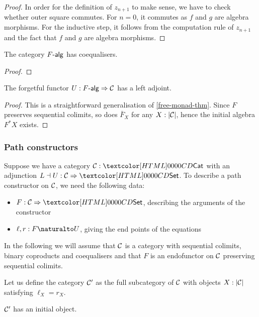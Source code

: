 \begin{proof}
  In order for the definition of $z_{n+1}$ to make sense, we have to
  check whether outer square commutes. For $n = 0$, it commutes as $f$
  and $g$ are algebra morphisms. For the inductive step, it follows
  from the computation rule of $z_{n+1}$ and the fact that $f$ and $g$
  are algebra morphisms.

  
\end{proof}

\begin{proposition}
  The category $\algcat{F}$ has coequalisers.
\end{proposition}

\begin{proof}
\end{proof}

\begin{proposition}
  The forgetful functor $U : \Func{\algcat{F}}{\Cc}$ has a left
  adjoint.
\end{proposition}

\begin{proof}
  This is a straightforward generalisation of
  \cref{free-monad-thm}. Since $F$ preserves sequential colimits, so
  does $\bar{F}_X$ for any $X : | \mathcal{C} |$, hence the initial algebra
  $F^* X$ exists.
\end{proof}

\subsubsection{Path constructors}
Suppose we have a category $\Cc : \Cat$ with an adjunction
$L \dashv U : \Func{\Cc}{\Set}$. To describe a path constructor
on $\mathcal{C}$, we need the following data:
\begin{itemize}
\item $F : \Func{\Cc}{\Set}$, describing the arguments of the constructor
\item $\ell, r : \Nat{F}{U}$, giving the end points of the equations
\end{itemize}

In the following we will assume that $\mathcal{C}$ is a category with
sequential colimits, binary coproducts and coequalisers and that $F$
is an endofunctor on $\mathcal{C}$ preserving sequential colimits.

Let us define the category $\mathcal{C}'$ as the full subcategory of $\mathcal{C}$
with objects $X : | \mathcal{C} |$ satisfying $\ell_X = r_X$.

\begin{proposition}
  $\mathcal{C}'$ has an initial object.
\end{proposition}

